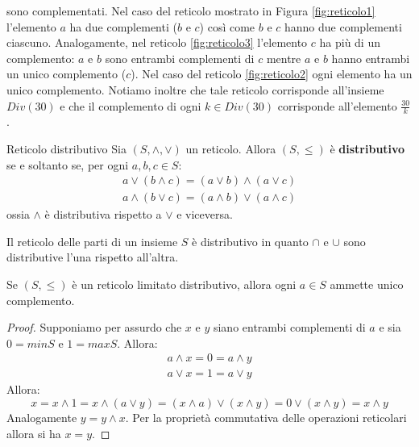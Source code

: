 \begin{example}
\begin{center}
\begin{minipage}{.3\textwidth}
\begin{tikzpicture}
			\end{tikzpicture}
			\label{fig:reticolo3}
		\end{minipage}
	\end{center}
	sono complementati. Nel caso del reticolo mostrato in Figura \ref{fig:reticolo1} l'elemento $a$ ha due complementi ($b$ e $c$) così come $b$ e $c$ hanno due complementi ciascuno. Analogamente, nel reticolo \ref{fig:reticolo3} l'elemento $c$ ha più di un complemento: $a$ e $b$ sono entrambi complementi di $c$ mentre $a$ e $b$ hanno entrambi un unico complemento ($c$). Nel caso del reticolo \ref{fig:reticolo2} ogni elemento ha un unico complemento. Notiamo inoltre che tale reticolo corrisponde all'insieme $Div(30)$ e che il complemento di ogni $k \in Div(30)$ corrisponde all'elemento $\frac{30}{k}$.
\end{example}

\begin{defbox}{Reticolo distributivo}
	Sia $(S,\wedge,\vee)$ un reticolo. Allora $(S,\leq)$ è \textbf{distributivo} se e soltanto se, per ogni $a,b,c \in S$:
	\begin{displaymath}
		\begin{array}{l}
			a \vee (b \wedge c) = (a \vee b) \wedge (a \vee c)\\
			a \wedge (b \vee c) = (a \wedge b) \vee (a \wedge c)
		\end{array}
	\end{displaymath}
	ossia $\wedge$ è distributiva rispetto a $\vee$ e viceversa.
\end{defbox}

\begin{example}
	Il reticolo delle parti di un insieme $S$ è distributivo in quanto $\cap$ e $\cup$ sono distributive l'una rispetto all'altra.
\end{example}


\begin{propbox}
	Se $(S,\leq)$ è un reticolo limitato distributivo, allora ogni $a \in S$ ammette unico complemento.
\end{propbox}


\begin{proof}
	Supponiamo per assurdo che $x$ e $y$ siano entrambi complementi di $a$ e sia $0= min S$ e $1= max S$. Allora:
	\begin{displaymath}
		\begin{array}{l}
			a \wedge x = 0 = a \wedge y \\
			a \vee x = 1 = a \vee y
		\end{array}
	\end{displaymath}
	Allora:
	\begin{displaymath}
		x = x \wedge 1 = x \wedge (a \vee y) = (x \wedge a) \vee (x \wedge y) = 0 \vee (x \wedge y) = x \wedge y
	\end{displaymath}
	Analogamente $y= y \wedge x$. Per la proprietà commutativa delle operazioni reticolari allora si ha $x=y$. 
\end{proof}


